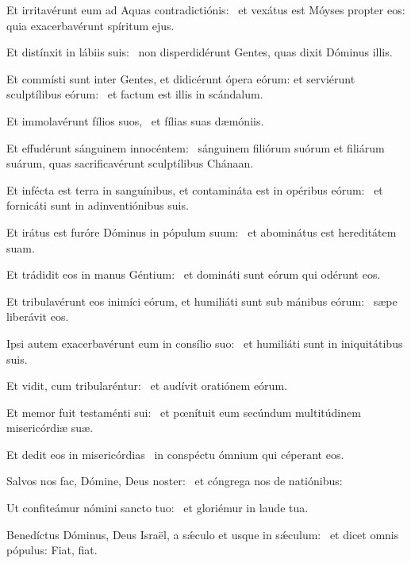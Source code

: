\item Et irritavérunt eum ad Aquas contradictiónis:~\psstar{} et vexátus est Móyses propter eos: quia exacerbavérunt spíritum ejus.

\item Et distínxit in lábiis suis:~\psstar{} non disperdidérunt Gentes, quas dixit Dóminus illis.

\item Et commísti sunt inter Gentes, et didicérunt ópera eórum: et serviérunt sculptílibus eórum:~\psstar{} et factum est illis in scándalum.

\item Et immolavérunt fílios suos,~\psstar{} et fílias suas dæmóniis.

\item Et effudérunt sánguinem innocéntem:~\psstar{} sánguinem filiórum suórum et filiárum suárum, quas sacrificavérunt sculptílibus Chánaan.

\item Et infécta est terra in sanguínibus, et contamináta est in opéribus eórum:~\psstar{} et fornicáti sunt in adinventiónibus suis.

\item Et irátus est furóre Dóminus in pópulum suum:~\psstar{} et abominátus est hereditátem suam.

\item Et trádidit eos in manus Géntium:~\psstar{} et domináti sunt eórum qui odérunt eos.

\item Et tribulavérunt eos inimíci eórum, et humiliáti sunt sub mánibus eórum:~\psstar{} sæpe liberávit eos.

\item Ipsi autem exacerbavérunt eum in consílio suo:~\psstar{} et humiliáti sunt in iniquitátibus suis.

\item Et vidit, cum tribularéntur:~\psstar{} et audívit oratiónem eórum.

\item Et memor fuit testaménti sui:~\psstar{} et pœnítuit eum secúndum multitúdinem misericórdiæ suæ.

\item Et dedit eos in misericórdias~\psstar{} in conspéctu ómnium qui céperant eos.

\item Salvos nos fac, Dómine, Deus noster:~\psstar{} et cóngrega nos de natiónibus:

\item Ut confiteámur nómini sancto tuo:~\psstar{} et gloriémur in laude tua.

\item Benedíctus Dóminus, Deus Israël, a sǽculo et usque in sǽculum:~\psstar{} et dicet omnis pópulus: Fiat, fiat.